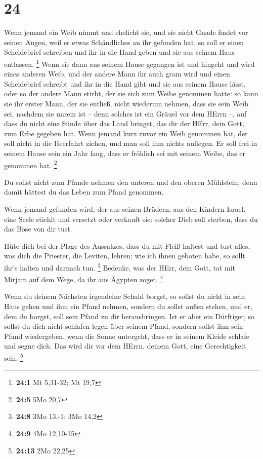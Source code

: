 \hypertarget{section-5}{%
\section{24}\label{section-5}}

 Wenn jemand ein Weib nimmt und ehelicht sie, und sie nicht
Gnade findet vor seinen Augen, weil er etwas Schändliches an ihr
gefunden hat, so soll er einen Scheidebrief schreiben und ihr in die
Hand geben und sie aus seinem Haus entlassen. \footnote{\textbf{24:1} Mt
  5,31-32; Mt 19,7}  Wenn sie dann aus seinem Hause gegangen
ist und hingeht und wird eines anderen Weib,  und der andere
Mann ihr auch gram wird und einen Scheidebrief schreibt und ihr in die
Hand gibt und sie aus seinem Hause lässt, oder so der andere Mann
stirbt, der sie sich zum Weibe genommen hatte:  so kann sie
ihr erster Mann, der sie entließ, nicht wiederum nehmen, dass sie sein
Weib sei, nachdem sie unrein ist -- denn solches ist ein Gräuel vor dem
HErrn --, auf dass du nicht eine Sünde über das Land bringst, das dir
der HErr, dein Gott, zum Erbe gegeben hat.  Wenn jemand kurz
zuvor ein Weib genommen hat, der soll nicht in die Heerfahrt ziehen, und
man soll ihm nichts auflegen. Er soll frei in seinem Hause sein ein Jahr
lang, dass er fröhlich sei mit seinem Weibe, das er genommen hat.
\footnote{\textbf{24:5} 5Mo 20,7}

 Du sollst nicht zum Pfande nehmen den unteren und den
oberen Mühlstein; denn damit hättest du das Leben zum Pfand genommen.

 Wenn jemand gefunden wird, der aus seinen Brüdern, aus den
Kindern Israel, eine Seele stiehlt und versetzt oder verkauft sie:
solcher Dieb soll sterben, dass du das Böse von dir tust.

 Hüte dich bei der Plage des Aussatzes, dass du mit Fleiß
haltest und tust alles, was dich die Priester, die Leviten, lehren; wie
ich ihnen geboten habe, so sollt ihr's halten und darnach tun.
\footnote{\textbf{24:8} 3Mo 13,-1; 3Mo 14,2}  Bedenke, was
der HErr, dein Gott, tat mit Mirjam auf dem Wege, da ihr aus Ägypten
zoget. \footnote{\textbf{24:9} 4Mo 12,10-15}

 Wenn du deinem Nächsten irgendeine Schuld borgst, so
sollst du nicht in sein Haus gehen und ihm ein Pfand nehmen,
 sondern du sollst außen stehen, und er, dem du borgst,
soll sein Pfand zu dir herausbringen.  Ist er aber ein
Dürftiger, so sollst du dich nicht schlafen legen über seinem Pfand,
 sondern sollst ihm sein Pfand wiedergeben, wenn die Sonne
untergeht, dass er in seinem Kleide schlafe und segne dich. Das wird dir
vor dem HErrn, deinem Gott, eine Gerechtigkeit sein. \footnote{\textbf{24:13}
  2Mo 22,25}

